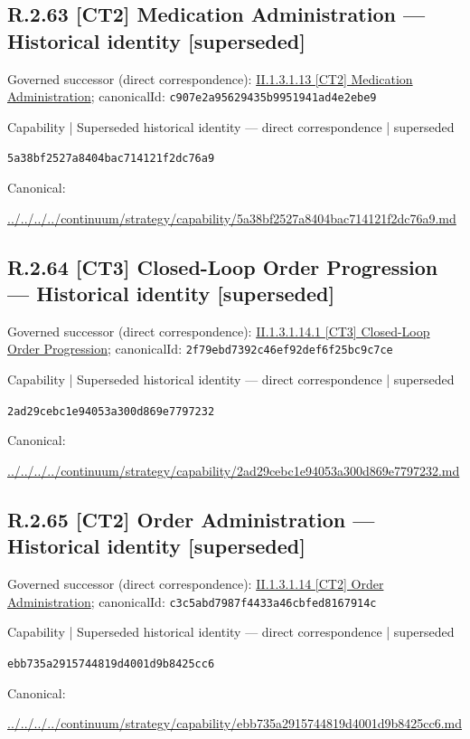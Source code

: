 \documentclass[10pt,a4paper]{article}
\begin{document}
\subsection*{R.2.63 [CT2] Medication Administration — Historical identity [superseded]}
Governed successor (direct correspondence): \hyperref[element-c907e2a95629435b9951941ad4e2ebe9]{II.1.3.1.13 [CT2] Medication Administration}; canonicalId: \texttt{c907e2a95629435b9951941ad4e2ebe9}\par
\label{element-5a38bf2527a8404bac714121f2dc76a9}
{\small Capability | Superseded historical identity — direct correspondence | superseded}\par
\texttt{5a38bf2527a8404bac714121f2dc76a9}\par
Canonical: \par
{\footnotesize\url{../../../../continuum/strategy/capability/5a38bf2527a8404bac714121f2dc76a9.md}}\par
\subsection*{R.2.64 [CT3] Closed-Loop Order Progression — Historical identity [superseded]}
Governed successor (direct correspondence): \hyperref[element-2f79ebd7392c46ef92def6f25bc9c7ce]{II.1.3.1.14.1 [CT3] Closed-Loop Order Progression}; canonicalId: \texttt{2f79ebd7392c46ef92def6f25bc9c7ce}\par
\label{element-2ad29cebc1e94053a300d869e7797232}
{\small Capability | Superseded historical identity — direct correspondence | superseded}\par
\texttt{2ad29cebc1e94053a300d869e7797232}\par
Canonical: \par
{\footnotesize\url{../../../../continuum/strategy/capability/2ad29cebc1e94053a300d869e7797232.md}}\par
\subsection*{R.2.65 [CT2] Order Administration — Historical identity [superseded]}
Governed successor (direct correspondence): \hyperref[element-c3c5abd7987f4433a46cbfed8167914c]{II.1.3.1.14 [CT2] Order Administration}; canonicalId: \texttt{c3c5abd7987f4433a46cbfed8167914c}\par
\label{element-ebb735a2915744819d4001d9b8425cc6}
{\small Capability | Superseded historical identity — direct correspondence | superseded}\par
\texttt{ebb735a2915744819d4001d9b8425cc6}\par
Canonical: \par
{\footnotesize\url{../../../../continuum/strategy/capability/ebb735a2915744819d4001d9b8425cc6.md}}\par
\end{document}
